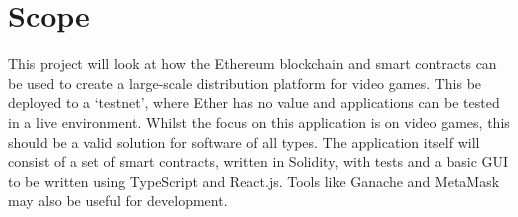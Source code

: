 \section{Scope}

This project will look at how the Ethereum blockchain and smart contracts can be used to create a large-scale distribution platform for video games. This be deployed to a `testnet', where Ether has no value and applications can be tested in a live environment. Whilst the focus on this application is on video games, this should be a valid solution for software of all types.
\x
The application itself will consist of a set of smart contracts, written in Solidity, with tests and a basic GUI to be written using TypeScript and React.js. Tools like Ganache and MetaMask may also be useful for development.